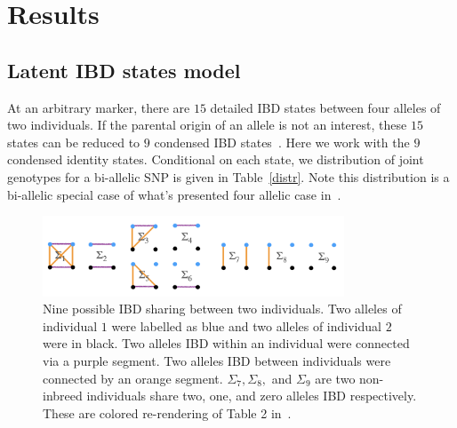 \documentclass[11pt,Times]{article}
\def\cite{\citep}
\begin{document}


\newpage
\section{Results}

\subsection{Latent IBD states model}
At an arbitrary marker, there are $15$ detailed IBD states between four alleles of two individuals.   
If the parental origin of an allele is not an interest, these $15$ states can be reduced to $9$ condensed IBD states~\cite{jacquard.72,thompson.13}. 
Here we work with the $9$ condensed identity states. Conditional on each state, we distribution of joint genotypes for a bi-allelic SNP is given in Table~\ref{distr}. Note this distribution is a bi-allelic special case of what's presented four allelic case in~\cite{thompson.13}. 

\begin{figure}[htbp]
\begin{center}
\includegraphics[width=0.8\textwidth]{jacquard.png}
\caption{Nine possible IBD sharing between two individuals. Two alleles of individual $1$ were labelled as blue and two alleles of individual $2$ were in black.  Two alleles IBD within an individual were connected via a purple segment. Two alleles IBD between individuals were connected by an orange segment. $\Sigma_7, \Sigma_8,$ and $\Sigma_9$ are two non-inbreed individuals share two, one, and zero alleles IBD respectively.  These are colored re-rendering of Table 2 in~\cite{jacquard.72}.}
\label{j9}
\end{center}
\end{figure}
\end{document}
